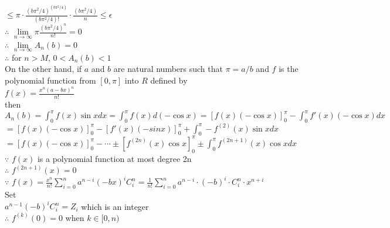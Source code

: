 \documentclass{article}
\begin{document}
\hskip 3.36cm $\displaystyle \leq \pi \cdot \frac{(b\pi^2/4)^{(b\pi^2/4)}}{(b\pi^2/4)!} \cdot \frac{(b\pi^2/4)}{n} \leq \epsilon$\\

$\therefore$ \qquad $\lim \limits_{n \to \infty} \pi \frac{(b\pi^2/4)^n}{n!} = 0$\\

$\therefore$ \qquad $\lim \limits_{n \to \infty} A_n(b) = 0$\\

$\therefore$ \qquad for $n > M$, $0 < A_n(b) < 1$\\

On the other hand, if $a$ and $b$ are natural numbers such that $\pi = a/b$ and $f$ is the polynomial function from $[0,\pi]$ into $R$ defined by\\

$\displaystyle f(x) = \frac{x^n(a-bx)^n}{n!}$\\

then\\

$\displaystyle A_n(b) = \int_0^{\pi} f(x) \sin{x} dx = \int_0^{\pi} f(x) d(-\cos{x}) = [f(x)(- \cos{x})]_0^{\pi} - \int_0^{\pi} f'(x)(-\cos{x}) dx$\\

\hskip 0.97cm $\displaystyle = [f(x)(-\cos{x})]_0^{\pi} - [f'(x)(-sinx)]_0^{\pi} + \int_0^{\pi} -f^{(2)}(x) \sin{x} dx$\\

\hskip 0.97cm $\displaystyle = [f(x)(-\cos{x})]_0^{\pi} - \cdots \pm [f^{(2n)}(x) \cos{x}]_0^{\pi} \pm \int_0^{\pi} f^{(2n+1)}(x) \cos{x} dx$\\

$\because$ \qquad $f(x)$ is a polynomial function at most degree 2n\\

$\therefore$ \qquad $f^{(2n+1)}(x) = 0$\\

$\because$ \qquad $\displaystyle f(x) = \frac{x^n}{n!} \sum \limits_{i=0}^n a^{n-i} (-bx)^i C_i^n = \frac{1}{n!} \sum \limits_{i=0}^n a^{n-i} \cdot (-b)^i \cdot C_i^n \cdot x^{n+i}$\\

Set\\

$a^{n-1} (-b)^i C_i^n = Z_i$ which is an integer\\

$\therefore$ \qquad $\displaystyle f^{(k)}(0) = 0$ when $k \in [0,n)$\\
\end{document}
